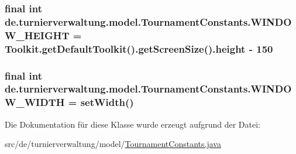 \subsubsection[{\texorpdfstring{W\+I\+N\+D\+O\+W\+\_\+\+H\+E\+I\+G\+HT}{WINDOW_HEIGHT}}]{\setlength{\rightskip}{0pt plus 5cm}final int de.\+turnierverwaltung.\+model.\+Tournament\+Constants.\+W\+I\+N\+D\+O\+W\+\_\+\+H\+E\+I\+G\+HT = Toolkit.\+get\+Default\+Toolkit().get\+Screen\+Size().height -\/ 150\hspace{0.3cm}{\ttfamily [static]}}\hypertarget{classde_1_1turnierverwaltung_1_1model_1_1_tournament_constants_a85d2c1cc994b3a6f44007541e7a3f9be}{}\label{classde_1_1turnierverwaltung_1_1model_1_1_tournament_constants_a85d2c1cc994b3a6f44007541e7a3f9be}
\subsubsection[{\texorpdfstring{W\+I\+N\+D\+O\+W\+\_\+\+W\+I\+D\+TH}{WINDOW_WIDTH}}]{\setlength{\rightskip}{0pt plus 5cm}final int de.\+turnierverwaltung.\+model.\+Tournament\+Constants.\+W\+I\+N\+D\+O\+W\+\_\+\+W\+I\+D\+TH = set\+Width()\hspace{0.3cm}{\ttfamily [static]}}\hypertarget{classde_1_1turnierverwaltung_1_1model_1_1_tournament_constants_a22eaed25de0312b3c20dffba71e282ff}{}\label{classde_1_1turnierverwaltung_1_1model_1_1_tournament_constants_a22eaed25de0312b3c20dffba71e282ff}


Die Dokumentation für diese Klasse wurde erzeugt aufgrund der Datei\+:\begin{DoxyCompactItemize}
\item 
src/de/turnierverwaltung/model/\hyperlink{_tournament_constants_8java}{Tournament\+Constants.\+java}\end{DoxyCompactItemize}

